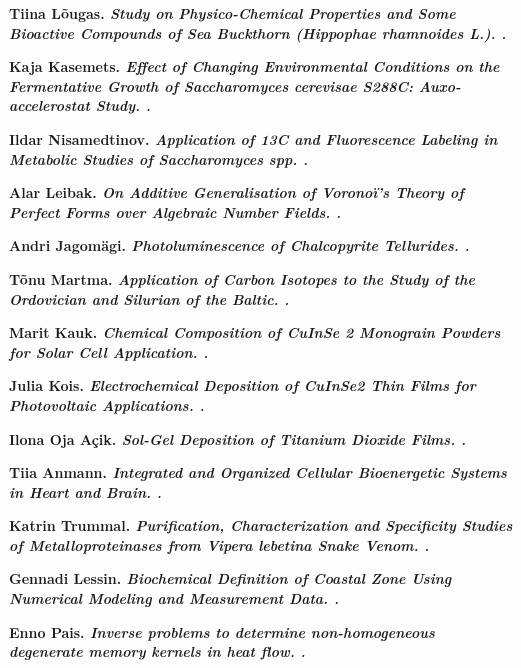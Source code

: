 \begin{list}
\item \bf Tiina L\~ougas. \it Study on Physico-Chemical Properties and Some
  Bioactive Compounds of Sea Buckthorn (Hippophae rhamnoides
  L.). .

\item \bf Kaja Kasemets. \it Effect of Changing Environmental Conditions on
  the Fermentative Growth of Saccharomyces cerevisae S288C:
  Auxo-accelerostat Study. .

\item \bf Ildar Nisamedtinov. \it Application of 13C and Fluorescence Labeling
  in Metabolic Studies of Saccharomyces spp. .

\item \bf Alar Leibak. \it On Additive Generalisation of Voronoï’s Theory of
  Perfect Forms over Algebraic Number Fields. .

\item \bf Andri Jagom\"agi. \it Photoluminescence of Chalcopyrite
  Tellurides. .

\item \bf T\~onu Martma. \it Application of Carbon Isotopes to the Study of
  the Ordovician and Silurian of the Baltic. .

\item \bf Marit Kauk. \it Chemical Composition of CuInSe 2 Monograin Powders
  for Solar Cell Application. .

\item \bf Julia Kois. \it Electrochemical Deposition of CuInSe2 Thin Films for
  Photovoltaic Applications. .

\item \bf Ilona Oja A\c{c}ik. \it Sol-Gel Deposition of Titanium Dioxide
  Films. .

\item \bf Tiia Anmann. \it Integrated and Organized Cellular Bioenergetic
  Systems in Heart and Brain. .

\item \bf Katrin Trummal. \it Purification, Characterization and Specificity
  Studies of Metalloproteinases from Vipera lebetina Snake
  Venom. .

\item \bf Gennadi Lessin. \it Biochemical Definition of Coastal Zone Using
  Numerical Modeling and Measurement Data. .

\item \bf Enno Pais. \it Inverse problems to determine non-homogeneous
  degenerate memory kernels in heat flow. .


\end{list}
